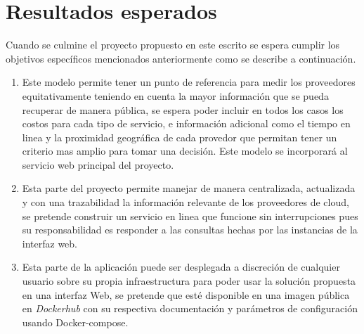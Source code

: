 \chapter{Resultados esperados} %

\label{ch:resultados} %



Cuando se culmine el proyecto propuesto en este escrito se espera cumplir los objetivos específicos mencionados anteriormente como se describe a continuación.

\begin{enumerate}
  \item Este modelo permite tener un punto de referencia para medir los proveedores equitativamente teniendo en cuenta la mayor información que se pueda recuperar de manera pública, se espera poder incluir en todos los casos los costos para cada tipo de servicio, e información adicional como el tiempo en linea y la proximidad geográfica de cada provedor que permitan tener un criterio mas amplio para tomar una decisión. Este modelo se incorporará al servicio web principal del proyecto.
  
  \item Esta parte del proyecto permite manejar de manera centralizada, actualizada y con una trazabilidad la información relevante de los proveedores de cloud, se pretende construir un servicio en linea que funcione sin interrupciones pues su responsabilidad es responder a las consultas hechas por las instancias de la interfaz web.
  
  \item Esta parte de la aplicación puede ser desplegada a discreción de cualquier usuario sobre su propia infraestructura para poder usar la solución propuesta en una interfaz Web, se pretende que esté disponible en una imagen pública en \textit{Dockerhub} con su respectiva documentación y parámetros de configuración usando \acs{Docker-compose}.
  
\end{enumerate}


      
